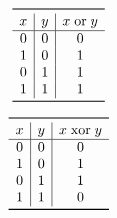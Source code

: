 \documentclass[t,aspectratio=169]{beamer}
\begin{document}
\begin{frame}
\begin{columns}
        \begin{column}{0.49\textwidth}
            \begin{minipage}{0.69\textwidth}
                \begin{equation*}
                    \begin{array}{c|c|c}
                        \toprule
                        x & y & x\;\mathrm{or}\;y \\
                        \hline
                        0 & 0 & 0 \\
                        1 & 0 & 1 \\
                        0 & 1 & 1 \\
                        1 & 1 & 1 \\
                        \bottomrule
                    \end{array}
                \end{equation*}
            \end{minipage}
            \begin{minipage}{0.19\textwidth}
            \end{minipage}
            \par\vspace{1.0cm}
            \begin{minipage}{0.69\textwidth}
                \begin{equation*}
                    \begin{array}{c|c|c}
                        \toprule
                        x & y & x\;\mathrm{xor}\;y \\
                        \hline
                        0 & 0 & 0 \\
                        1 & 0 & 1 \\
                        0 & 1 & 1 \\
                        1 & 1 & 0 \\
                        \bottomrule
                    \end{array}
                \end{equation*}
            \end{minipage}
            \begin{minipage}{0.19\textwidth}
            \end{minipage}
        \end{column}
    \end{columns}
\end{frame}
\end{document}
